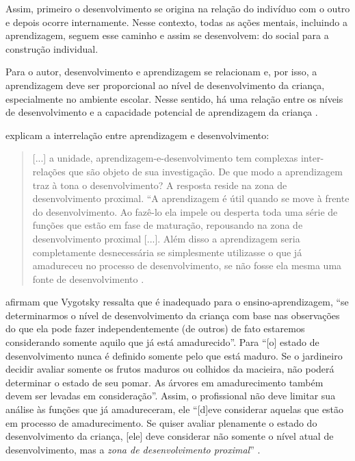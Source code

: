 \documentclass{textolivre}
\begin{document}
Assim, primeiro o desenvolvimento se origina na relação do indivíduo com o outro e depois ocorre internamente. Nesse contexto, todas as ações mentais, incluindo a aprendizagem, seguem esse caminho e assim se desenvolvem: do social para a construção individual.

Para o autor, desenvolvimento e aprendizagem se relacionam e, por isso, a aprendizagem deve ser proporcional ao nível de desenvolvimento da criança, especialmente no ambiente escolar. Nesse sentido, há uma relação entre os níveis de desenvolvimento e a capacidade potencial de aprendizagem da criança \cite{vygotski1991}.

\textcite{newman2002} explicam a interrelação entre aprendizagem e desenvolvimento:

\begin{quote}
[...] a unidade, aprendizagem-e-desenvolvimento tem complexas inter-relações que são objeto de sua investigação. De que modo a aprendizagem traz à tona o desenvolvimento? A resposta reside na zona de desenvolvimento proximal. “A aprendizagem é útil quando se move à frente do desenvolvimento. Ao fazê-lo ela impele ou desperta toda uma série de funções que estão em fase de maturação, repousando na zona de desenvolvimento proximal [...]. Além disso a aprendizagem seria completamente desnecessária se simplesmente utilizasse o que já amadureceu no processo de desenvolvimento, se não fosse ela mesma uma fonte de desenvolvimento \cite[p. 76]{newman2002}.
\end{quote}

\textcite[p. 72]{newman2002} afirmam que Vygotsky ressalta que é inadequado para o ensino-aprendizagem, “se determinarmos o nível de desenvolvimento da criança com base nas observações do que ela pode fazer independentemente (de outros) de fato estaremos considerando somente aquilo que já está amadurecido”. Para \textcite[p. 208-209]{vygotski1991} “[o] estado de desenvolvimento nunca é definido somente pelo que está maduro. Se o jardineiro decidir avaliar somente os frutos maduros ou colhidos da macieira, não poderá determinar o estado de seu pomar. As árvores em amadurecimento também devem ser levadas em consideração”. Assim, o profissional não deve limitar sua análise às funções que já amadureceram, ele “[d]eve considerar aquelas que estão em processo de amadurecimento. Se quiser avaliar plenamente o estado do desenvolvimento da criança, [ele] deve considerar não somente o nível atual de desenvolvimento, mas a \emph{zona de desenvolvimento proximal}” \cite[p. 208-209]{vygotski1991}.
\end{document}
